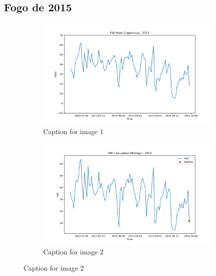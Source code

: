 \subsection{Fogo de 2015}
\begin{figure}[h]
\caption{HELLo}
    \centering
    \begin{subfigure}{0.49\textwidth}
        \centering
        \includegraphics[width=\textwidth]{graphs/2015/2015CopernicusFWI12.png}
        \caption{Caption for image 1}
        \label{fig:img1}
    \end{subfigure}
    \hfill
    \begin{subfigure}{0.49\textwidth}
        \centering
        \includegraphics[width=\textwidth]{graphs/2015/2015CalcFWI12.png}
        \caption{Caption for image 2}
        \label{fig:img2}
    \end{subfigure}
    \label{fig:both_images}
\end{figure}

